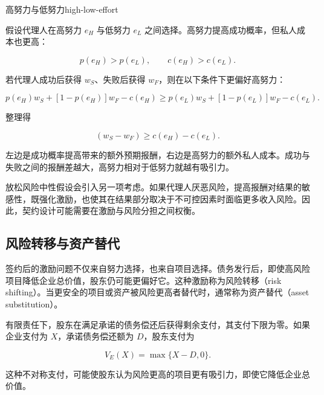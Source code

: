 \begin{example}{高努力与低努力}{high-low-effort}

假设代理人在高努力 $e_H$ 与低努力 $e_L$ 之间选择。高努力提高成功概率，但私人成本也更高：

\begin{equation*}
p(e_H)>p(e_L),
\qquad
c(e_H)>c(e_L).
\end{equation*}

若代理人成功后获得 $w_S$、失败后获得 $w_F$，则在以下条件下更偏好高努力：

\begin{equation*}
p(e_H)w_S+[1-p(e_H)]w_F-c(e_H)
\geq
p(e_L)w_S+[1-p(e_L)]w_F-c(e_L).
\end{equation*}

整理得

\begin{equation*}
[p(e_H)-p(e_L)](w_S-w_F)
\geq
c(e_H)-c(e_L).
\label{eq:ch3-effort-spread}
\end{equation*}

左边是成功概率提高带来的额外预期报酬，右边是高努力的额外私人成本。成功与失败之间的报酬差越大，高努力相对于低努力就越有吸引力。

\end{example}

放松风险中性假设会引入另一项考虑。如果代理人厌恶风险，提高报酬对结果的敏感性，既强化激励，也使其在结果部分取决于不可控因素时面临更多收入风险。因此，契约设计可能需要在激励与风险分担之间权衡。

\subsection{风险转移与资产替代}

签约后的激励问题不仅来自努力选择，也来自项目选择。债务发行后，即使高风险项目降低企业总价值，股东仍可能更偏好它。这种激励称为风险转移（risk shifting）。当更安全的项目或资产被风险更高者替代时，通常称为资产替代（asset substitution）。

有限责任下，股东在满足承诺的债务偿还后获得剩余支付，其支付下限为零。如果企业支付为 $X$，承诺债务偿还额为 $D$，股东支付为

\begin{equation}
V_E(X)=\max\{X-D,0\}.
\label{eq:ch3-equity-payoff}
\end{equation}

这种不对称支付，可能使股东认为风险更高的项目更有吸引力，即使它降低企业总价值。

